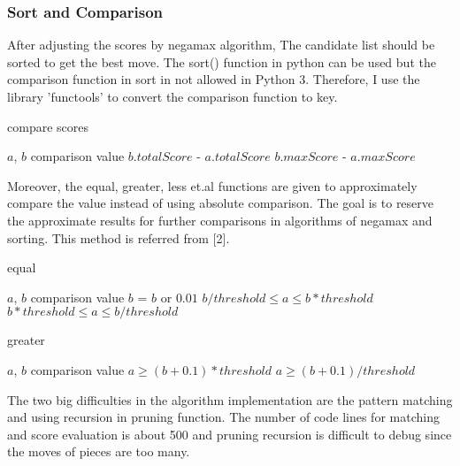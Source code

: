 \documentclass[conference,compsoc]{IEEEtran}
\renewcommand{\algorithmicrequire}{\textbf{Input:}}
\renewcommand{\algorithmicensure}{\textbf{Output:}}
\begin{document}
\subsubsection{Sort and Comparison}
After adjusting the scores by negamax algorithm, The candidate list should be sorted to get the best move. The sort() function in python can be used but the comparison function in sort in not allowed in Python 3. Therefore, I use the library 'functools' to convert the comparison function to key.

\begin{algorithm}
 \caption{compare scores}
 \begin{algorithmic}[h]
 \renewcommand{\algorithmicrequire}{\textbf{Input:}}
 \renewcommand{\algorithmicensure}{\textbf{Output:}}
 \REQUIRE $a$, $b$
 \ENSURE comparison value 
  \RETURN $b.totalScore$ - $a.totalScore$
  \ENDIF
  \RETURN $b.maxScore$ - $a.maxScore$
\end{algorithmic} 
\end{algorithm}

Moreover, the equal, greater, less et.al functions are given to approximately compare the value instead of using absolute comparison. The goal is to reserve the approximate results for further comparisons in algorithms of negamax and sorting. This method is referred from [2].

\begin{algorithm}
 \caption{equal}
 \begin{algorithmic}[h]
 \renewcommand{\algorithmicrequire}{\textbf{Input:}}
 \renewcommand{\algorithmicensure}{\textbf{Output:}}
 \REQUIRE $a$, $b$
 \ENSURE comparison value 
  \STATE $b$ = $b$ or $0.01$
  \RETURN $b/threshold\leq a\leq b*threshold$
  \ENDIF
  \RETURN $b*threshold\leq a\leq b/threshold$
 \end{algorithmic} 
 \end{algorithm}
 
\begin{algorithm}
 \caption{greater}
 \begin{algorithmic}[h]
 \renewcommand{\algorithmicrequire}{\textbf{Input:}}
 \renewcommand{\algorithmicensure}{\textbf{Output:}}
 \REQUIRE $a$, $b$
 \ENSURE comparison value 
  \RETURN $a\geq (b+0.1)*threshold$
  \ENDIF
  \RETURN $a\geq (b+0.1)/threshold$
 \end{algorithmic} 
 \end{algorithm}
 

The two big difficulties in the algorithm implementation are the pattern matching and using recursion in pruning function. The number of code lines for matching and score evaluation is about 500 and pruning recursion is difficult to debug since the moves of pieces are too many.   
\end{document}
